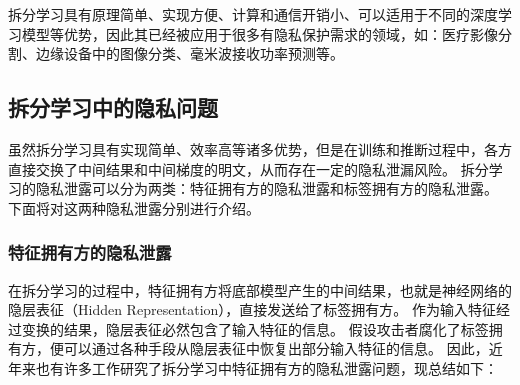 拆分学习具有原理简单、实现方便、计算和通信开销小、可以适用于不同的深度学习模型等优势，因此其已经被应用于很多有隐私保护需求的领域，如：医疗影像分割\cite{roth2022split_unet}、边缘设备中的图像分类\cite{fagbohungbe2022split_edge_image,palanisamy2021spliteasy}、毫米波接收功率预测\cite{koda2020split_mmwave}等。

\subsection{拆分学习中的隐私问题}
虽然拆分学习具有实现简单、效率高等诸多优势，但是在训练和推断过程中，各方直接交换了中间结果和中间梯度的明文，从而存在一定的隐私泄漏风险。
%
拆分学习的隐私泄露可以分为两类：特征拥有方的隐私泄露和标签拥有方的隐私泄露。
%
下面将对这两种隐私泄露分别进行介绍。
%
\subsubsection{特征拥有方的隐私泄露}
在拆分学习的过程中，特征拥有方将底部模型产生的中间结果，也就是神经网络的隐层表征（Hidden Representation），直接发送给了标签拥有方。
%
作为输入特征经过变换的结果，隐层表征必然包含了输入特征的信息。
%
假设攻击者腐化了标签拥有方，便可以通过各种手段从隐层表征中恢复出部分输入特征的信息。
因此，近年来也有许多工作研究了拆分学习中特征拥有方的隐私泄露问题，现总结如下：
%

